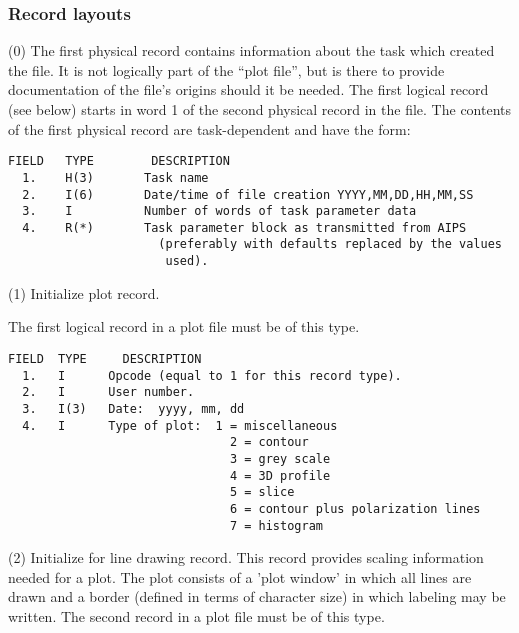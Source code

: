  
 
\subsubsection{Record layouts}
 
(0)  The first physical record
contains information about the task which created the file.  It
is not logically part of the ``plot file'', but is there to provide
documentation of the file's origins should it be needed.  The
first logical record (see below) starts in word 1 of the second
physical record in the file.  The contents of the first physical
record are task-dependent and have the form:
 
\begin{verbatim}
FIELD   TYPE        DESCRIPTION
  1.    H(3)       Task name
  2.    I(6)       Date/time of file creation YYYY,MM,DD,HH,MM,SS
  3.    I          Number of words of task parameter data
  4.    R(*)       Task parameter block as transmitted from AIPS
                     (preferably with defaults replaced by the values
                      used).
\end{verbatim}

 
(1)  Initialize plot record.
 
The first logical record in a plot file must be of this type.
 
\begin{verbatim}
FIELD  TYPE     DESCRIPTION
  1.   I      Opcode (equal to 1 for this record type).
  2.   I      User number.
  3.   I(3)   Date:  yyyy, mm, dd
  4.   I      Type of plot:  1 = miscellaneous
                               2 = contour
                               3 = grey scale
                               4 = 3D profile
                               5 = slice
                               6 = contour plus polarization lines
                               7 = histogram
\end{verbatim}
 
 
(2)  Initialize for line drawing record.
   This record provides scaling information needed for a plot.
The plot consists of a 'plot window' in which all lines are drawn
and a border (defined in terms of character size) in which
labeling may be written.  The second record in a plot file must be
of this type.
 
